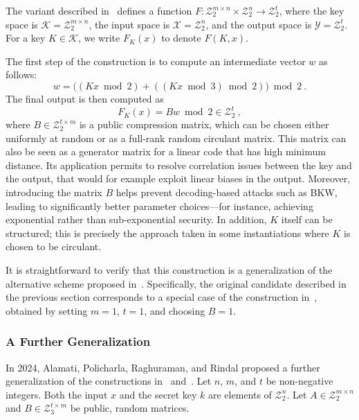 \documentclass[journal=tosc,submission]{iacrtrans}
\theoremstyle{theorem}
\newcommand\Z{\mathcal{Z}}
\begin{document}
The variant described in~\cite{C:DGHIKS21} defines a function $F : \Z_2^{m \times n} \times \Z_2^{n} \to \Z_2^t$, where the key space is $\mathcal{K} = \Z_2^{m \times n}$, the input space is $\mathcal{X} = \Z_2^n$, and the output space is $\mathcal{Y} = \Z_2^t$. For a key $K \in \mathcal{K}$, we write $F_K(x)$ to denote $F(K, x)$.

The first step of the construction is to compute an intermediate vector $w$ as follows:
\[
w = \big( (Kx \bmod 2) + \left((Kx \bmod 3) \bmod 2\right) \big) \bmod 2~.
\]
The final output is then computed as
\[
F_K(x) = Bw \bmod 2 \in \Z_2^t~,
\]
where $B \in \Z_2^{t \times m}$ is a public compression matrix, which can be chosen either uniformly at random or  as a full-rank random circulant matrix. This matrix can also be seen as a generator matrix for a linear code that has high minimum distance. Its application permits to resolve correlation issues between the key and the output, that would for example exploit linear biases in the output. Moreover, introducing the matrix $B$ helps prevent decoding-based attacks such as BKW, leading to significantly better parameter choices—for instance, achieving exponential rather than sub-exponential security. In addition, $K$ itself can be structured; this is precisely the approach taken in some instantiations where $K$ is chosen to be circulant.

It is straightforward to verify that this construction is a generalization of the alternative scheme proposed in~\cite{TCC:BIPSW18}. Specifically, the original candidate described in the previous section corresponds to a special case of the construction in~\cite{C:DGHIKS21}, obtained by setting $m = 1$, $t = 1$, and choosing $B = 1$.




\subsubsection{A Further Generalization~\cite{C:APRR24}}

In 2024, Alamati, Policharla, Raghuraman, and Rindal proposed a further generalization of the constructions in~\cite{TCC:BIPSW18} and~\cite{C:DGHIKS21}. Let $n$, $m$, and $t$ be non-negative integers. Both the input $x$ and the secret key $k$ are elements of $\Z_2^n$. Let $A \in \Z_2^{m \times n}$ and $B \in \Z_3^{t \times m}$ be public, random matrices.
\end{document}
